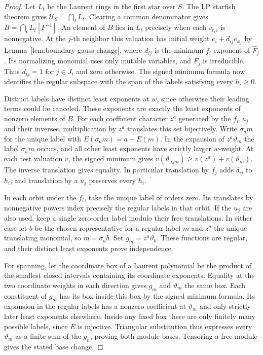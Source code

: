 \documentclass[11pt,reqno]{amsart}
\numberwithin{equation}{section}
\theoremstyle{definition}
\theoremstyle{remark}
\begin{document}
\begin{proof}
Let \(L_t\) be the Laurent rings in the first star over \(S\).
The LP starfish theorem gives \(\mathcal U_S=\bigcap_t L_t\).
Clearing a common denominator gives \(B=\bigcap_t L_t[F^{-1}]\).
An element of \(B\) lies in \(L_t\) precisely when each
\(v_{t,i}\) is nonnegative. At the \(j\)-th neighbor this
valuation has initial weight \(e_i+d_{ij}e_{x_j}\) by
Lemma~\ref{lem:boundary-gauss-change}, where \(d_{ij}\) is the
minimum \(f_i\)-exponent of \(\widehat F_j\). Its normalizing
monomial uses only mutable variables, and \(F_j\) is irreducible.
Thus \(d_{ij}=1\) for \(j\in J_i\) and zero otherwise. The signed
minimum formula now identifies the regular subspace with the span of
the labels satisfying every \(h_i\ge0\).

Distinct labels have distinct least exponents at \(w\), since otherwise
their leading terms could be canceled. These exponents are exactly the
least exponents of nonzero elements of \(B\). For each coefficient
character \(z^a\) generated by the \(f_i,u_j\) and their inverses,
multiplication by \(z^a\) translates this set bijectively. Write
\(\sigma_a m\) for the unique label with \(E(\sigma_a m)=a+E(m)\).
In the expansion of \(z^a\vartheta_m\) the label \(\sigma_a m\)
occurs, and all other least exponents have strictly larger
\(w\)-weight. At each test valuation \(v\), the signed minimum gives
\(v(\vartheta_{\sigma_a m})\ge v(z^a)+v(\vartheta_m)\).
The inverse translation gives equality. In particular translation
by \(f_j\) adds \(\delta_{ij}\) to \(h_i\), and translation by a
\(u_j\) preserves every \(h_i\).

In each orbit under the \(f_i\), take the unique label of orders zero.
Its translates by nonnegative powers index precisely the regular
labels in that orbit. If the \(u_j\) are also used, keep a single
zero-order label modulo their free translations. In either case let
\(b\) be the chosen representative for a regular label \(m\) and
\(z^a\) the unique translating monomial, so \(m=\sigma_a b\).
Set \(g_m=z^a\vartheta_b\). These functions are regular, and their
distinct least exponents prove independence.

For spanning, let the coordinate box of a Laurent polynomial be the
product of the smallest closed intervals containing its coordinate
exponents. Equality at the two coordinate weights in each direction
gives \(g_m\) and \(\vartheta_m\) the same box. Each constituent of
\(g_m\) has its box inside this box by the signed minimum formula.
Its expansion in the regular labels has a nonzero coefficient at
\(\vartheta_m\) and only strictly later least exponents elsewhere.
Inside any fixed box there are only finitely many possible labels,
since \(E\) is injective. Triangular substitution thus expresses
every \(\vartheta_m\) as a finite sum of the \(g_n\), proving both
module bases. Tensoring a free module gives the stated base change.
\end{proof}
\end{document}

